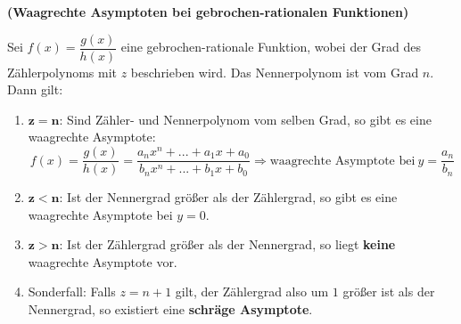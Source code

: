 \documentclass[ngerman, 12pt]{nssheetxea}
\begin{document}
\begin{theorem} \textbf{(Waagrechte Asymptoten bei gebrochen-rationalen Funktionen)} \par
Sei $f(x)=\dfrac{g(x)}{h(x)}$ eine gebrochen-rationale Funktion, wobei der Grad des Zählerpolynoms mit $z$ beschrieben wird. Das Nennerpolynom ist vom Grad $n$. Dann gilt:
\begin{enumerate}
\item $\mathbf{z=n}$: Sind Zähler- und Nennerpolynom vom selben Grad, so gibt es eine waagrechte Asymptote: 
\[ f(x) = \dfrac{g(x)}{h(x)} = \dfrac{a_nx^n+...+a_1x+a_0}{b_nx^n+...+b_1x+b_0} \Rightarrow \text{waagrechte Asymptote bei} \ y=\dfrac{a_n}{b_n}\]
\item $\mathbf{z<n}$: Ist der Nennergrad größer als der Zählergrad, so gibt es eine waagrechte Asymptote bei $y=0$.
\item $\mathbf{z>n}$: Ist der Zählergrad größer als der Nennergrad, so liegt \textbf{keine} waagrechte Asymptote vor.
\item Sonderfall: Falls $z=n+1$ gilt, der Zählergrad also um $1$ größer ist als der Nennergrad, so existiert eine \textbf{schräge Asymptote}.
\end{enumerate}
\label{Satz:Waag_Asympt}
 
\end{theorem}
\end{document}
